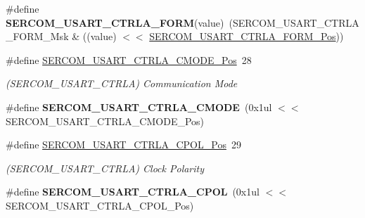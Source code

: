 \begin{DoxyCompactItemize}
\item 
\hypertarget{group___s_a_m_l21___s_e_r_c_o_m_ga79e17f6dc8a1219b1f95707e10eac9f4}{}\#define {\bfseries S\+E\+R\+C\+O\+M\+\_\+\+U\+S\+A\+R\+T\+\_\+\+C\+T\+R\+L\+A\+\_\+\+F\+O\+R\+M}(value)~(S\+E\+R\+C\+O\+M\+\_\+\+U\+S\+A\+R\+T\+\_\+\+C\+T\+R\+L\+A\+\_\+\+F\+O\+R\+M\+\_\+\+Msk \& ((value) $<$$<$ \hyperlink{group___s_a_m_l21___s_e_r_c_o_m_ga66b6fc1b386596d5426091b7e85171fa}{S\+E\+R\+C\+O\+M\+\_\+\+U\+S\+A\+R\+T\+\_\+\+C\+T\+R\+L\+A\+\_\+\+F\+O\+R\+M\+\_\+\+Pos}))\label{group___s_a_m_l21___s_e_r_c_o_m_ga79e17f6dc8a1219b1f95707e10eac9f4}

\item 
\hypertarget{group___s_a_m_l21___s_e_r_c_o_m_gad98b1700e833ae1e4433b54c5d96333a}{}\#define \hyperlink{group___s_a_m_l21___s_e_r_c_o_m_gad98b1700e833ae1e4433b54c5d96333a}{S\+E\+R\+C\+O\+M\+\_\+\+U\+S\+A\+R\+T\+\_\+\+C\+T\+R\+L\+A\+\_\+\+C\+M\+O\+D\+E\+\_\+\+Pos}~28\label{group___s_a_m_l21___s_e_r_c_o_m_gad98b1700e833ae1e4433b54c5d96333a}

\begin{DoxyCompactList}\small\item\em (S\+E\+R\+C\+O\+M\+\_\+\+U\+S\+A\+R\+T\+\_\+\+C\+T\+R\+L\+A) Communication Mode \end{DoxyCompactList}\item 
\hypertarget{group___s_a_m_l21___s_e_r_c_o_m_gaa7e612a64e92fcd39eb4f2f9a953cd25}{}\#define {\bfseries S\+E\+R\+C\+O\+M\+\_\+\+U\+S\+A\+R\+T\+\_\+\+C\+T\+R\+L\+A\+\_\+\+C\+M\+O\+D\+E}~(0x1ul $<$$<$ S\+E\+R\+C\+O\+M\+\_\+\+U\+S\+A\+R\+T\+\_\+\+C\+T\+R\+L\+A\+\_\+\+C\+M\+O\+D\+E\+\_\+\+Pos)\label{group___s_a_m_l21___s_e_r_c_o_m_gaa7e612a64e92fcd39eb4f2f9a953cd25}

\item 
\hypertarget{group___s_a_m_l21___s_e_r_c_o_m_gac0128d4edc5d1dcc9ab8a47b4df89d2b}{}\#define \hyperlink{group___s_a_m_l21___s_e_r_c_o_m_gac0128d4edc5d1dcc9ab8a47b4df89d2b}{S\+E\+R\+C\+O\+M\+\_\+\+U\+S\+A\+R\+T\+\_\+\+C\+T\+R\+L\+A\+\_\+\+C\+P\+O\+L\+\_\+\+Pos}~29\label{group___s_a_m_l21___s_e_r_c_o_m_gac0128d4edc5d1dcc9ab8a47b4df89d2b}

\begin{DoxyCompactList}\small\item\em (S\+E\+R\+C\+O\+M\+\_\+\+U\+S\+A\+R\+T\+\_\+\+C\+T\+R\+L\+A) Clock Polarity \end{DoxyCompactList}\item 
\hypertarget{group___s_a_m_l21___s_e_r_c_o_m_ga3904dfe1aa7ee2db68e11e9059cceb4e}{}\#define {\bfseries S\+E\+R\+C\+O\+M\+\_\+\+U\+S\+A\+R\+T\+\_\+\+C\+T\+R\+L\+A\+\_\+\+C\+P\+O\+L}~(0x1ul $<$$<$ S\+E\+R\+C\+O\+M\+\_\+\+U\+S\+A\+R\+T\+\_\+\+C\+T\+R\+L\+A\+\_\+\+C\+P\+O\+L\+\_\+\+Pos)\label{group___s_a_m_l21___s_e_r_c_o_m_ga3904dfe1aa7ee2db68e11e9059cceb4e}


\end{DoxyCompactItemize}
